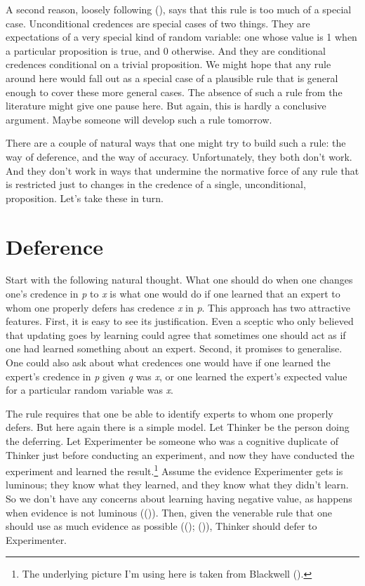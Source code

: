 \documentclass[
  10pt,
  letterpaper,
  DIV=11,
  numbers=noendperiod,
  twoside]{scrartcl}
\begin{document}
A second reason, loosely following
(), says that
this rule is too much of a special case. Unconditional credences are
special cases of two things. They are expectations of a very special
kind of random variable: one whose value is 1 when a particular
proposition is true, and 0 otherwise. And they are conditional credences
conditional on a trivial proposition. We might hope that any rule around
here would fall out as a special case of a plausible rule that is
general enough to cover these more general cases. The absence of such a
rule from the literature might give one pause here. But again, this is
hardly a conclusive argument. Maybe someone will develop such a rule
tomorrow.

There are a couple of natural ways that one might try to build such a
rule: the way of deference, and the way of accuracy. Unfortunately, they
both don't work. And they don't work in ways that undermine the
normative force of any rule that is restricted just to changes in the
credence of a single, unconditional, proposition. Let's take these in
turn.

\section{Deference}\label{sec-defer}

Start with the following natural thought. What one should do when one
changes one's credence in \emph{p} to \emph{x} is what one would do if
one learned that an expert to whom one properly defers has credence
\emph{x} in \emph{p}. This approach has two attractive features. First,
it is easy to see its justification. Even a sceptic who only believed
that updating goes by learning could agree that sometimes one should act
as if one had learned something about an expert. Second, it promises to
generalise. One could also ask about what credences one would have if
one learned the expert's credence in \emph{p} given \emph{q} was
\emph{x}, or one learned the expert's expected value for a particular
random variable was \emph{x}.

The rule requires that one be able to identify experts to whom one
properly defers. But here again there is a simple model. Let Thinker be
the person doing the deferring. Let Experimenter be someone who was a
cognitive duplicate of Thinker just before conducting an experiment, and
now they have conducted the experiment and learned the
result.\footnote{The underlying picture I'm using here is taken from
  Blackwell ().} Assume the evidence
Experimenter gets is luminous; they know what they learned, and they
know what they didn't learn. So we don't have any concerns about
learning having negative value, as happens when evidence is not luminous
(()). Then, given the venerable
rule that one should use as much evidence as possible
(();
()), Thinker should defer
to Experimenter.
\end{document}
